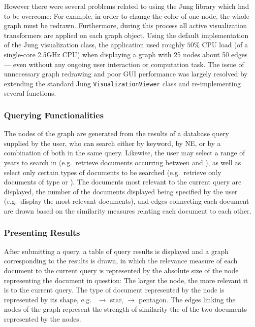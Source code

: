 
However there were several problems related to using the Jung library which had to be overcome: For example, in order to change the color of
one node, the whole graph must be redrawn. Furthermore, during this process all active visualization
transformers are applied on each graph object. Using the default implementation of the
Jung visualization class, the application used roughly $50\%$ CPU load (of a single-core 2.5GHz CPU) when displaying a graph with 25 nodes about 50 edges--- even without any ongoing user interaction or computation task. The issue of
unnecessary graph redrawing and poor GUI performance was largely resolved by extending
the standard Jung \texttt{VisualizationViewer} class and re-implementing several functions. 

\subsubsection {Querying Functionalities}
\label{sec:querying_functionalities}
The nodes of the graph are generated from the results of a database query supplied by the user, who
can search either by keyword, by NE, or by a combination of both in the same query. Likewise, the
user may select a range of years to search in (e.g.\ retrieve documents occurring between
 and ), as well as select only certain types of documents to be searched
(e.g.\ retrieve only documents of type  or ). The documents most
relevant to the current query are displayed, the number of the documents displayed being specified
by the user (e.g.\ display the  most relevant documents), and edges connecting each
document are drawn based on the similarity measures relating each document to each other.

\subsubsection {Presenting Results}
\label{sec:presenting_results}
After submitting a query, a table of query results is displayed and a graph corresponding to the
results is drawn, in which the relevance measure of each document to the current query is
represented by the absolute size of the node representing the document in question: The larger the
node, the more relevant it is to the current query. The type of document represented by the node is
represented by its shape, e.g.\  $\rightarrow$ star,  $\rightarrow$
pentagon. The edges linking the nodes of the graph represent the strength of similarity the of the
two documents represented by the nodes.